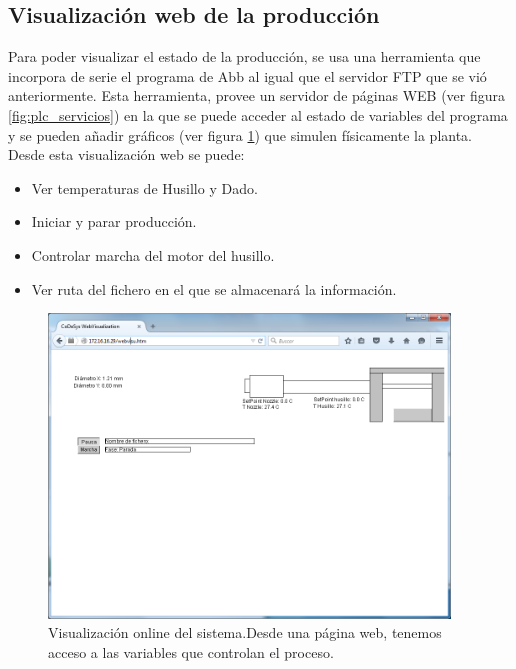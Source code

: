 \subsection{Visualización web de la producción}
\label{sec:plc_scada}

Para poder visualizar el estado de la producción, se usa una herramienta que incorpora de serie el programa de Abb al igual que el servidor FTP que se vió anteriormente. Esta herramienta, provee un servidor de páginas WEB (ver figura \ref{fig:plc_servicios}) en la que se puede acceder al estado de variables del programa y se pueden añadir gráficos (ver figura \ref{fig:plc_visu_web}) que simulen físicamente la planta. Desde esta visualización web se puede:

\begin{itemize}
    \item {Ver temperaturas de Husillo y Dado.}
    \item {Iniciar y parar producción.}
    \item {Controlar marcha del motor del husillo.}
    \item {Ver ruta del fichero en el que se almacenará la información.}
\end{itemize}

\begin{figure}[H]
    \centering
    \includegraphics[width=0.95\textwidth]{images/PLC/visu_online.png}
    \caption[Visualización online del sistema.]{Visualización online del sistema.Desde una página web, tenemos acceso a las variables que controlan el proceso.}
    \label{fig:plc_visu_web}
\end{figure}


